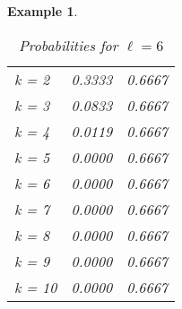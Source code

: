 \documentclass{article}
\newtheorem{example}{Example} %
\begin{document}
\begin{example}
\begin{table}[H]
\begin{minipage}{0.33\textwidth}
\begin{tabular}{lrr}
k = 2  &     0.3333 &         0.6667 \\
k = 3  &     0.0833 &         0.6667 \\
k = 4  &     0.0119 &         0.6667 \\
k = 5  &     0.0000 &         0.6667 \\
k = 6  &     0.0000 &         0.6667 \\
k = 7  &     0.0000 &         0.6667 \\
k = 8  &     0.0000 &         0.6667 \\
k = 9  &     0.0000 &         0.6667 \\
k = 10 &     0.0000 &         0.6667 \\
\hline
\end{tabular}
\caption{Probabilities for $\ell=6$}
\end{minipage}\hfill
\end{table}

\begin{table}[H]
\centering
\begin{minipage}{0.33\textwidth}


\end{minipage}
\end{table}
\end{example}
\end{document}
